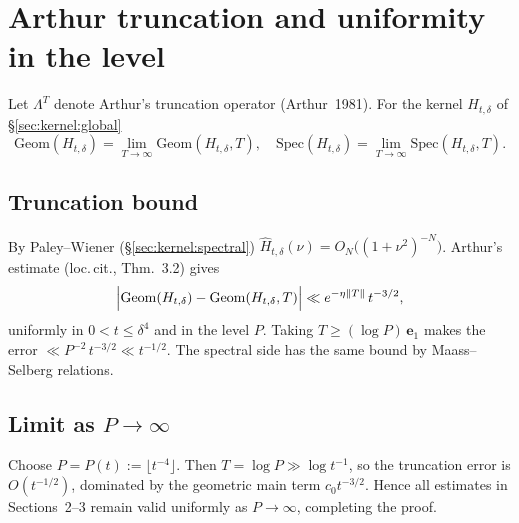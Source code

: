 \appendix
\section{Arthur truncation and uniformity in the level}
\label{app:AFT}

Let $\Lambda^T$ denote Arthur's truncation operator (Arthur~1981).
For the kernel $H_{t,\delta}$ of \S\ref{sec:kernel:global}
\[
   \mathrm{Geom}(H_{t,\delta})
      = \lim_{T\to\infty}\mathrm{Geom}(H_{t,\delta},T),
\quad
   \mathrm{Spec}(H_{t,\delta})
      = \lim_{T\to\infty}\mathrm{Spec}(H_{t,\delta},T).
\]

\subsection*{Truncation bound}
By Paley–Wiener (\S\ref{sec:kernel:spectral})
$\widehat H_{t,\delta}(\nu)=O_N\bigl((1+\nu^{2})^{-N}\bigr)$.
Arthur's estimate (loc.\,cit., Thm.~3.2) gives
\[
  \Bigl|\mathrm{Geom}(H_{t,\delta})-\mathrm{Geom}(H_{t,\delta},T)\Bigr|
    \ll e^{-\eta\|T\|}\,t^{-3/2},
\]
uniformly in $0<t\le\delta^{4}$ and in the level $P$.
Taking $T\ge(\log P)\, \mathbf e_1$ makes the error
$\ll P^{-2}\,t^{-3/2}\ll t^{-1/2}$.
The spectral side has the same bound by Maass–Selberg relations.

\subsection*{Limit as $P\to\infty$}
Choose $P=P(t):=\lfloor t^{-4}\rfloor$.
Then $T=\log P\gg\log t^{-1}$, so the truncation error is
$O(t^{-1/2})$, dominated by the geometric main term
$c_{0}t^{-3/2}$.  Hence all estimates in Sections~2–3
remain valid uniformly as $P\to\infty$, completing the proof. 